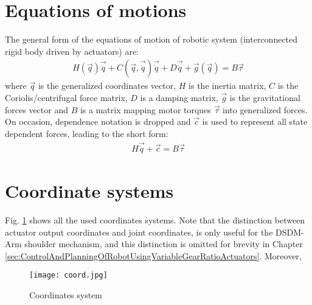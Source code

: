\section{Equations of motions}
\label{sec:eom}

The general form of the equations of motion of robotic system (interconnected rigid body driven by actuators) are:
%
\begin{align}
H(\vec{q}) \vec{\ddot{q}} + C(\vec{q},\vec{\dot{q}}) \vec{\dot{q}} + D \vec{\dot{q}} + \vec{g}(\vec{q}) = B \vec{\tau} 
\label{eq:manipulator}
\end{align}
%
where $\vec{q}$ is the generalized coordinates vector, $H$ is the inertia matrix, $C$ is the Coriolis/centrifugal force matrix, $D$ is a damping matrix, $\vec{g}$ is the gravitational forces vector and $B$ is a matrix mapping motor torques $\vec{\tau}$ into generalized forces.
On occasion, dependence notation is dropped and $\vec{c}$ is used to represent all state dependent forces, leading to the short form:
%
\begin{align}
H \vec{\ddot{q}} + \vec{c} = B \vec{\tau} 
\label{eq:manipulator_short}
\end{align}

\section{Coordinate systems}
\label{sec:coord}

Fig. \ref{fig:coord} shows all the used coordinates systems. Note that the distinction between actuator output coordinates and joint coordinates, is only useful for the DSDM-Arm shoulder mechanism, and this distinction is omitted for brevity in Chapter \ref{sec:ControlAndPlanningOfRobotUsingVariableGearRatioActuators}. Moreover, 

\begin{figure}[H]
	\centering
		\texttt{[image: coord.jpg]}
	\caption{Coordinates system}
	\label{fig:coord}
\end{figure}

